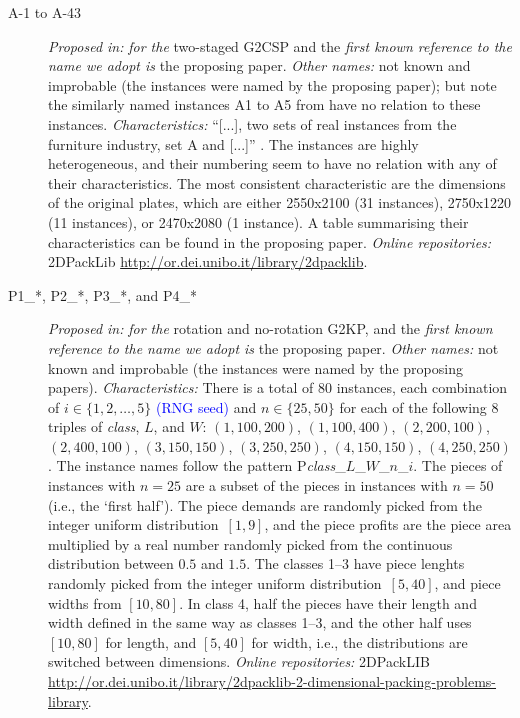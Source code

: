 \documentclass[ppgc,tese,english,formais,babel]{iiufrgs}
\newif\iffinalversion
\newcommand{\newtext}[1]{\iffinalversion%
#1%
\else%
\textcolor{blue}{#1}%
\fi%
}
\begin{document}
\begin{description}
\item[A-1 to A-43] \emph{Proposed in:} \citet{macedo:2010} \emph{for the} two-staged G2CSP and the \emph{first known reference to the name we adopt is} the proposing paper. \emph{Other names:} not known and improbable (the instances were named by the proposing paper); but note the similarly named instances A1 to A5 from \citet{hifi:1997} have no relation to these instances. \emph{Characteristics:} ``[...],  two sets of real instances from the furniture industry, set A and [...]'' \citep[p. 7]{macedo:2010}. The instances are highly heterogeneous, and their numbering seem to have no relation with any of their characteristics. The most consistent characteristic are the dimensions of the original plates, which are either 2550x2100 (31 instances), 2750x1220 (11 instances), or 2470x2080 (1 instance). A table summarising their characteristics can be found in the proposing paper. \emph{Online repositories:} 2DPackLib \url{http://or.dei.unibo.it/library/2dpacklib}.
\item [P1\_*, P2\_*, P3\_*, and P4\_*] \emph{Proposed in:} \citet{velasco:2019} \emph{for the} rotation and no-rotation G2KP, and the \emph{first known reference to the name we adopt is} the proposing paper. \emph{Other names:} not known and improbable (the instances were named by the proposing papers). \emph{Characteristics: } There is a total of 80 instances, each combination of \(i \in \{1, 2, \dots, 5\}\) \newtext{(RNG seed)} and \(n \in \{25, 50\}\) for each of the following 8 triples of \emph{class}, \(L\), and \(W\): \((1, 100, 200)\), \((1, 100, 400)\), \((2, 200, 100)\), \((2, 400, 100)\), \((3, 150, 150)\), \((3, 250, 250)\), \((4, 150, 150)\), \((4, 250, 250)\). The instance names follow the pattern P\emph{class}\_\(L\)\_\(W\)\_\(n\)\_\(i\). The pieces of instances with \(n = 25\) are a subset of the pieces in instances with \(n = 50\) (i.e., the `first half'). The piece demands are randomly picked from the integer uniform distribution~\([1, 9]\), and the piece profits are the piece area multiplied by a real number randomly picked from the continuous distribution between \(0.5\) and \(1.5\). The classes 1--3 have piece lenghts randomly picked from the integer uniform distribution~\([5, 40]\), and piece widths from \([10, 80]\). In class 4, half the pieces have their length and width defined in the same way as classes 1--3, and the other half uses \([10, 80]\) for length, and \([5, 40]\) for width, i.e., the distributions are switched between dimensions. \emph{Online repositories:} 2DPackLIB \url{http://or.dei.unibo.it/library/2dpacklib-2-dimensional-packing-problems-library}.

\end{description}
\end{document}
